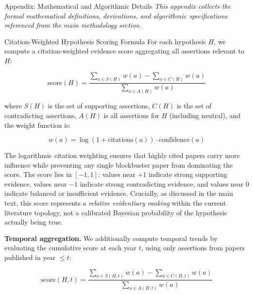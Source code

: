 \documentclass[
  ignorenonframetext,
]{beamer}
\author{\texorpdfstring{}{}}
\date{}
\begin{document}
\begin{frame}[fragile]{Appendix: Mathematical and Algorithmic Details
\label{sec:technical_appendix}}
\protect{}\label{appendix-mathematical-and-algorithmic-details}
\emph{This appendix collects the formal mathematical definitions,
derivations, and algorithmic specifications referenced from the main
methodology section.}

\begin{block}{Citation-Weighted Hypothesis Scoring Formula
\label{sec:appendix_scoring}}
\protect{}\label{citation-weighted-hypothesis-scoring-formula}
For each hypothesis \(H\), we compute a citation-weighted evidence score
aggregating all assertions relevant to \(H\):

\begin{equation}
\text{score}(H) = \frac{\sum_{a \in S(H)} w(a) - \sum_{a \in C(H)} w(a)}{\sum_{a \in A(H)} w(a)} \label{eq:app_score}
\end{equation}

where \(S(H)\) is the set of supporting assertions, \(C(H)\) is the set
of contradicting assertions, \(A(H)\) is all assertions for \(H\)
(including neutral), and the weight function is:

\begin{equation}
w(a) = \log(1 + \text{citations}(a)) \cdot \text{confidence}(a) \label{eq:app_weight}
\end{equation}

The logarithmic citation weighting ensures that highly cited papers
carry more influence while preventing any single blockbuster paper from
dominating the score. The score lies in \([-1, 1]\): values near \(+1\)
indicate strong supporting evidence, values near \(-1\) indicate strong
contradicting evidence, and values near \(0\) indicate balanced or
insufficient evidence. Crucially, as discussed in the main text, this
score represents a \emph{relative evidentiary ranking} within the
current literature topology, not a calibrated Bayesian probability of
the hypothesis actually being true.

\textbf{Temporal aggregation.} We additionally compute temporal trends
by evaluating the cumulative score at each year \(t\), using only
assertions from papers published in year \(\leq t\):

\begin{equation}
\text{score}(H, t) = \frac{\sum_{a \in S(H,t)} w(a) - \sum_{a \in C(H,t)} w(a)}{\sum_{a \in A(H,t)} w(a)} \label{eq:app_score_t}
\end{equation}


\end{block}
\end{frame}
\end{document}
